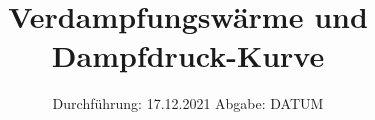 

\subject{VERSUCH Nr. 203}
\title{Verdampfungswärme und Dampfdruck-Kurve}
\date{%
  Durchführung: 17.12.2021
  \hspace{3em}
  Abgabe: DATUM
}



\maketitle
\thispagestyle{empty}
\tableofcontents
\newpage







\printbibliography{}


